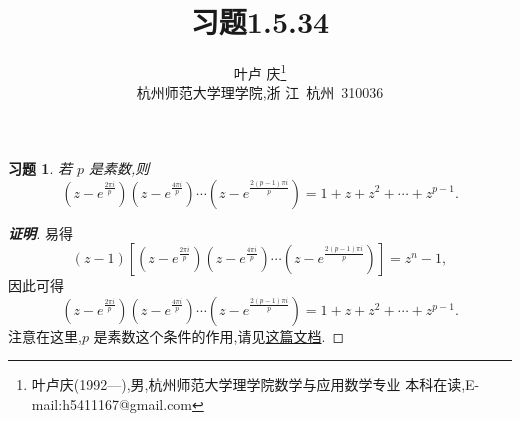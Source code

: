 \documentclass[a4paper]{article}
\newtheorem*{exercise}{习题}
\begin{document}
\title{\huge{\bf{习题1.5.34}}} \author{\small{叶卢
    庆\footnote{叶卢庆(1992---),男,杭州师范大学理学院数学与应用数学专业
      本科在读,E-mail:h5411167@gmail.com}}\\{\small{杭州师范大学理学院,浙
      江~杭州~310036}}}
\maketitle
\begin{exercise}
  若 $p$ 是素数,则
$$
(z-e^{\frac{2\pi i}{p}})(z-e^{\frac{4\pi i}{p}})\cdots
(z-e^{\frac{2(p-1)\pi i}{p}})=1+z+z^2+\cdots+z^{p-1}.
$$
\end{exercise}
\begin{proof}[\textbf{证明}]
 易得
$$
(z-1)[(z-e^{\frac{2\pi i}{p}})(z-e^{\frac{4\pi i}{p}})\cdots
(z-e^{\frac{2(p-1)\pi i}{p}})]=z^n-1,
$$
因此可得
$$
(z-e^{\frac{2\pi i}{p}})(z-e^{\frac{4\pi i}{p}})\cdots
(z-e^{\frac{2(p-1)\pi i}{p}})=1+z+z^2+\cdots+z^{p-1}.
$$
注意在这里,$p$ 是素数这个条件的作用,请见\href{https://github.com/Ye-luqing/number-theory/blob/master/%E6%9C%BA%E6%A2%B0%E8%9B%99%E8%B7%B3%E6%A0%BC%E5%AD%90.tex}{这篇文档}.
\end{proof}
\end{document}
